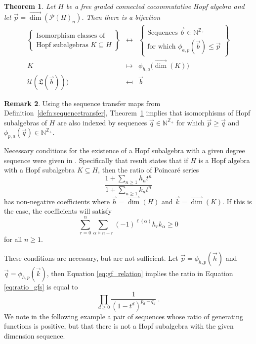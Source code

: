 \documentclass[11pt]{amsart}
\newtheorem{theorem}{Theorem}[section]
\theoremstyle{definition}
\newtheorem{remark}[theorem]{Remark}
\numberwithin{equation}{section}
\def\NN{{\mathbb N}}
\def\ZZ{{\mathbb Z}}
\newcommand{\vecdim}{\overrightarrow{\dim}}
\begin{document}
\begin{theorem}
\label{thm:subclassification2}
Let $H$ be a free graded connected cocommutative Hopf algebra and let $\vec{p} = \vecdim(\mathcal{P}(H)_{n})$.  Then there is a bijection
\[
\begin{array}{rcl}
\left\{\begin{array}{c}
\text{Isomorphism classes of} \\
\text{Hopf subalgebras $K \subseteq H$}
\end{array}\right\}
& \leftrightarrow & 
\left\{\begin{array}{c}
\text{Sequences $\vec{b} \in \NN^{\ZZ_{+}}$} \\
\text{for which $\phi_{a, p}(\vec{b}) \le \vec{p}$} 
\end{array}\right\} \\[1.5em]
K & \mapsto & \phi_{h, a} \big( \vecdim(K)\big) \\
\mathcal{U}(\mathfrak{L}(\vec{b}))) & \mapsfrom & \vec{b}
\end{array}
\]
\end{theorem}

\begin{remark}
Using the sequence transfer maps from Definition~\ref{defn:sequencetransfer}, Theorem~\ref{thm:subclassification2} implies that isomorphisms of Hopf subalgebras of $H$ are also indexed by sequences $\vec{q} \in \NN^{\ZZ_{+}}$ for which $\vec{p} \ge \vec{q}$ and $\phi_{p, a}(\vec{q}) \in \NN^{\ZZ_{+}}$.
\end{remark}

Necessary conditions for the existence of a Hopf subalgebra with a given degree sequence were given in
\cite[Corollary 1.4]{AL13}.  Specifically that result states that if $H$ is a Hopf algebra with
a Hopf subalgebra $K \subseteq H$, then the ratio of Poincar\'e series
\begin{equation}
\label{eq:ratio_gfs}
\frac{1 + \sum_{n \geq 1} h_n t^n}{1 + \sum_{n \geq 1} k_n t^n}
\end{equation}
has non-negative coefficients where $\vec{h} = \vecdim(H)$ and $\vec{k} = \vecdim(K)$.
If this is the case, the coefficients will satisfy
\[
\sum_{r=0}^n \sum_{\alpha \models n-r} (-1)^{\ell(\alpha)} h_r k_\alpha \geq 0
\]
for all $n \geq 1$.

These conditions are necessary, but are not sufficient.
Let $\vec{p} = \phi_{h,p}(\vec{h})$ and
$\vec{q} = \phi_{h,p}(\vec{k})$, then Equation \eqref{eq:gf_relation} implies
the ratio in Equation \eqref{eq:ratio_gfs} is equal to
\[
\prod_{d \geq 0} \frac{1}{(1-t^d)^{p_d - q_d}}~.
\]
We note in the following example a pair of sequences whose ratio of generating
functions is positive, but that there is not a Hopf subalgebra with the given
dimension sequence.
\end{document}
